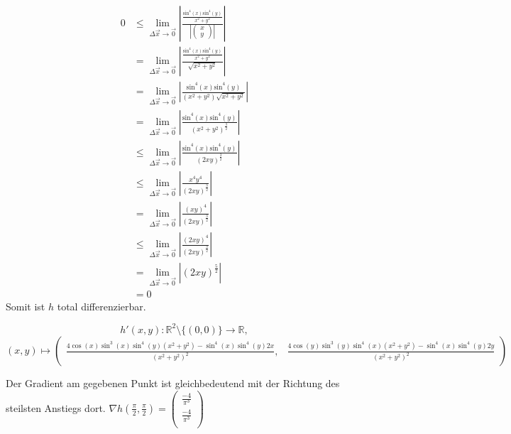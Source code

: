 \documentclass[10pt,a4paper,parskip=half]{scrartcl}
\newcommand{\vectwo}[2]{\left(\begin {array} {c}#1\\#2\\\end {array} \right)}
\begin{document}
\begin{enumerate}[(i)]
\begin{align*}
0 &\le\lim_{\Delta \vec x \to \vec 0} \left|\frac{\frac{\text{sin}^4(x)\text{sin}^4(y)}{x^2 + y^2}}{\left|\begin{pmatrix}x\\y\end{pmatrix} \right|}\right| \\
&= \lim_{\Delta \vec x \to \vec 0} \left|\frac{\frac{\text{sin}^4(x)\text{sin}^4(y)}{x^2 + y^2}}{\sqrt{x^2+y^2}}\right| \\
&= \lim_{\Delta \vec x \to \vec 0} \left|\frac{\text{sin}^4(x)\text{sin}^4(y)}{(x^2 + y^2)\sqrt{x^2+y^2}}\right| \\
&= \lim_{\Delta \vec x \to \vec 0} \left|\frac{\text{sin}^4(x)\text{sin}^4(y)}{(x^2 + y^2)^{\frac{3}{2}}}\right| \\
&\le \lim_{\Delta \vec x \to \vec 0} \left|\frac{\text{sin}^4(x)\text{sin}^4(y)}{(2xy)^{\frac{3}{2}}}\right| \\
&\le \lim_{\Delta \vec x \to \vec 0} \left|\frac{x^4y^4}{(2xy)^{\frac{3}{2}}}\right| \\
&= \lim_{\Delta \vec x \to \vec 0} \left|\frac{(xy)^4}{(2xy)^{\frac{3}{2}}}\right| \\
&\le \lim_{\Delta \vec x \to \vec 0} \left|\frac{(2xy)^4}{(2xy)^{\frac{3}{2}}}\right| \\
&= \lim_{\Delta \vec x \to \vec 0} \left|(2xy)^{\frac{5}{2}}\right| \\
&= 0
\end{align*}
Somit ist $h$ total differenzierbar.

\[
h'(x,y): \mathbb{R}^2\setminus{\{(0,0)\}} \to \mathbb{R}, 
\]
\[
(x,y) \mapsto \left( \begin{array}{cc} 
\frac{4\cos(x)\sin^3(x)\sin^4(y)(x^2 + y^2) - \sin^4(x)\sin^4(y)2x}{(x^2 + y^2)^2}, &
\frac{4\cos(y)\sin^3(y)\sin^4(x)(x^2 + y^2) - \sin^4(x)\sin^4(y)2y}{(x^2 + y^2)^2}
\end{array}\right)
\]

Der Gradient am gegebenen Punkt ist gleichbedeutend mit der Richtung des steilsten Anstiegs dort. \(\nabla h(\frac{\pi}{2},\frac{\pi}{2}) = \vectwo{\frac{-4}{\pi^3}}{\frac{-4}{\pi^3}}\)


\end{enumerate}
\end{document}
